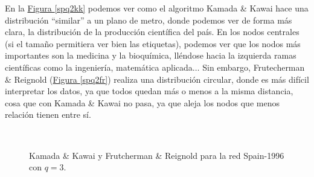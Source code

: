 \documentclass[paper=a4, fontsize=11pt]{article} %
\numberwithin{equation}{section} %
\numberwithin{figure}{section} %
\numberwithin{table}{section} %
\begin{document}
En la \hyperref[spq2kk]{Figura \ref*{spq2kk}} podemos ver como el algoritmo Kamada \& Kawai hace una distribución ``similar'' a un plano de metro, donde podemos ver de forma más clara, la distribución de la producción científica del país. En los nodos centrales (si el tamaño permitiera ver bien las etiquetas), podemos ver que los nodos más importantes son la medicina y la bioquímica, lléndose hacia la izquierda ramas científicas como la ingeniería, matemática aplicada$\ldots$ Sin embargo, Frutecherman \& Reignold (\hyperref[spq2fr]{Figura \ref*{spq2fr}}) realiza una distribución circular, donde es más difícil interpretar los datos, ya que todos quedan más o menos a la misma distancia, cosa que con Kamada \& Kawai no pasa, ya que aleja los nodos que menos relación tienen entre sí.

\begin{figure}[H]
    \centering
    \mbox {
      \qquad
    }
    \caption{Kamada \& Kawai y Frutcherman \& Reignold para la red Spain-1996 con $q=3$.}
    \label{spq3}
\end{figure}
\end{document}
